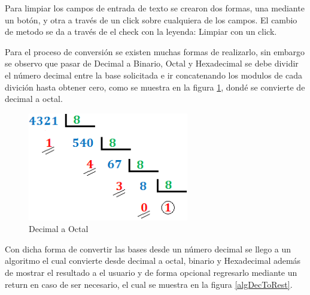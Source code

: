 \documentclass[letterpaper,12pt]{extarticle}%
\begin{document}
		Para limpiar los campos de entrada de texto se crearon dos formas, una mediante
		un botón, y otra a través de un click sobre cualquiera de los campos. El cambio de 
		metodo se da a través de el check con la leyenda: Limpiar con un click.
		
		Para el proceso de conversión se existen muchas formas de realizarlo, sin embargo
		se observo que pasar de Decimal a Binario, Octal y Hexadecimal se debe dividir el número
		decimal entre la base solicitada e ir concatenando los modulos de cada divición
		hasta obtener cero, como se muestra en la figura \ref{decToOct}, dondé se convierte de decimal
		a octal.

		\begin{figure}[H]
		\begin{center}
		\includegraphics[width=7cm]{imag//decimalToOctal.png}
		\caption{Decimal a Octal}
		\label{decToOct}
		\end{center}
		\end{figure}

		Con dicha forma de convertir las bases desde un número decimal se llego a un algoritmo el cual
		convierte desde decimal a octal, binario y Hexadecimal además de mostrar el resultado a el usuario
		y de forma opcional regresarlo mediante un return en caso de ser necesario, el cual se muestra en la 
		figura \ref{algDecToRest}.
\end{document}
